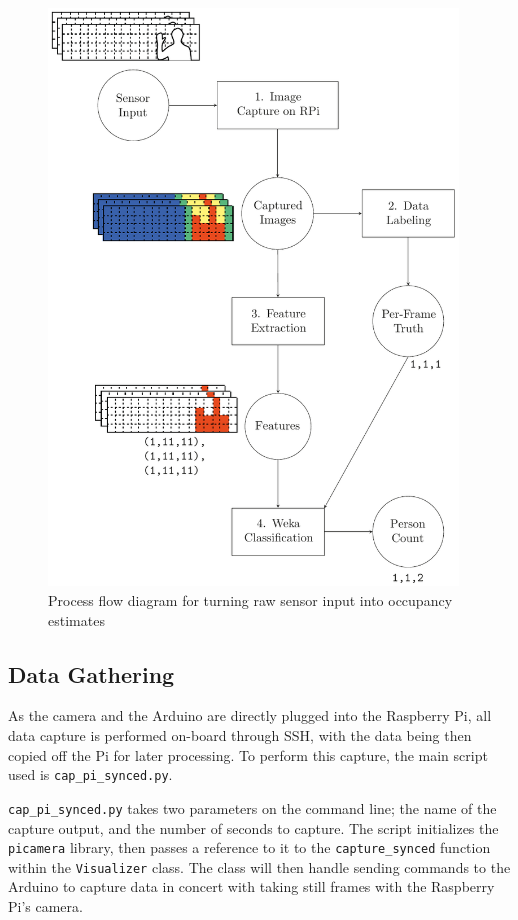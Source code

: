 \documentclass[../thesis/thesis.tex]{subfiles}
\begin{document}
\begin{figure}
\centering
\includegraphics[width=0.97\textwidth]{../diagrams/process-pics.pdf}
\caption{Process flow diagram for turning raw sensor input into occupancy estimates}
\label{fig:methods:flowchart}
\end{figure}

\subsection{Data Gathering}
As the camera and the Arduino are directly plugged into the Raspberry Pi, all data capture is performed on-board through SSH, with the data being then copied off the Pi for later processing. To perform this capture, the main script used is \texttt{cap\_pi\_synced.py}.

\texttt{cap\_pi\_synced.py} takes two parameters on the command line; the name of the capture output, and the number of seconds to capture. The script initializes the \texttt{picamera} library, then passes a reference to it to the \texttt{capture\_synced} function within the \texttt{Visualizer} class. The class will then handle sending commands to the Arduino to capture data in concert with taking still frames with the Raspberry Pi's camera.
\end{document}
